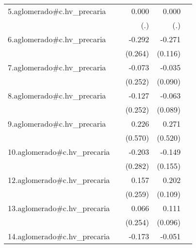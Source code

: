 {\begin{longtable}{l*{4}{D{.}{.}{-1}}}
\addlinespace
5.aglomerado#c.hv\_precaria&                     &       0.000         &       0.000         &                     \\
            &                     &         (.)         &         (.)         &                     \\
\addlinespace
6.aglomerado#c.hv\_precaria&                     &      -0.292         &      -0.271\sym{*}  &                     \\
            &                     &     (0.264)         &     (0.116)         &                     \\
\addlinespace
7.aglomerado#c.hv\_precaria&                     &      -0.073         &      -0.035         &                     \\
            &                     &     (0.252)         &     (0.090)         &                     \\
\addlinespace
8.aglomerado#c.hv\_precaria&                     &      -0.127         &      -0.063         &                     \\
            &                     &     (0.252)         &     (0.089)         &                     \\
\addlinespace
9.aglomerado#c.hv\_precaria&                     &       0.226         &       0.271         &                     \\
            &                     &     (0.570)         &     (0.520)         &                     \\
\addlinespace
10.aglomerado#c.hv\_precaria&                     &      -0.203         &      -0.149         &                     \\
            &                     &     (0.282)         &     (0.155)         &                     \\
\addlinespace
12.aglomerado#c.hv\_precaria&                     &       0.157         &       0.202         &                     \\
            &                     &     (0.259)         &     (0.109)         &                     \\
\addlinespace
13.aglomerado#c.hv\_precaria&                     &       0.066         &       0.111         &                     \\
            &                     &     (0.254)         &     (0.096)         &                     \\
\addlinespace
14.aglomerado#c.hv\_precaria&                     &      -0.173         &      -0.051         &                     \\

\end{longtable}}
